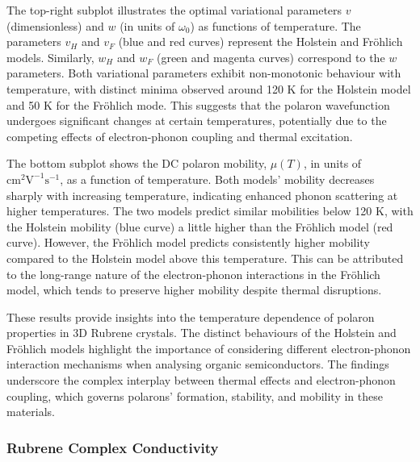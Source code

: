 The top-right subplot illustrates the optimal variational parameters $v$ (dimensionless) and $w$ (in units of $\omega_0$) as functions of temperature. The parameters $v_H$ and $v_F$ (blue and red curves) represent the Holstein and Fr\"ohlich models. Similarly, $w_H$ and $w_F$ (green and magenta curves) correspond to the $w$ parameters. Both variational parameters exhibit non-monotonic behaviour with temperature, with distinct minima observed around 120 K for the Holstein model and 50 K for the Fr\"ohlich mode. This suggests that the polaron wavefunction undergoes significant changes at certain temperatures, potentially due to the competing effects of electron-phonon coupling and thermal excitation.

The bottom subplot shows the DC polaron mobility, $\mu(T)$, in units of $\text{cm}^2\text{V}^{-1}\text{s}^{-1}$, as a function of temperature. Both models' mobility decreases sharply with increasing temperature, indicating enhanced phonon scattering at higher temperatures. The two models predict similar mobilities below 120 K, with the Holstein mobility (blue curve) a little higher than the Fr\"ohlich model (red curve). However, the Fr\"ohlich model predicts consistently higher mobility compared to the Holstein model above this temperature. This can be attributed to the long-range nature of the electron-phonon interactions in the Fr\"ohlich model, which tends to preserve higher mobility despite thermal disruptions.

These results provide insights into the temperature dependence of polaron properties in 3D Rubrene crystals. The distinct behaviours of the Holstein and Fr\"ohlich models highlight the importance of considering different electron-phonon interaction mechanisms when analysing organic semiconductors. The findings underscore the complex interplay between thermal effects and electron-phonon coupling, which governs polarons' formation, stability, and mobility in these materials.

\subsubsection{Rubrene Complex Conductivity}


